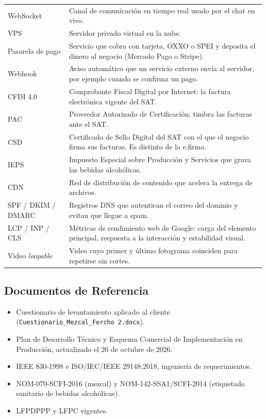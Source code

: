 \documentclass[11pt,letterpaper]{article}
\begin{document}
\begin{longtable}{@{} >{\raggedright\arraybackslash}p{3.4cm} >{\raggedright\arraybackslash}p{12.4cm} @{}}
WebSocket & Canal de comunicación en tiempo real usado por el chat en vivo. \\
VPS & Servidor privado virtual en la nube. \\
Pasarela de pago & Servicio que cobra con tarjeta, OXXO o SPEI y deposita el dinero al negocio (Mercado Pago o Stripe). \\
Webhook & Aviso automático que un servicio externo envía al servidor, por ejemplo cuando se confirma un pago. \\
CFDI 4.0 & Comprobante Fiscal Digital por Internet: la factura electrónica vigente del SAT. \\
PAC & Proveedor Autorizado de Certificación: timbra las facturas ante el SAT. \\
CSD & Certificado de Sello Digital del SAT con el que el negocio firma sus facturas. Es distinto de la e.firma. \\
IEPS & Impuesto Especial sobre Producción y Servicios que grava las bebidas alcohólicas. \\
CDN & Red de distribución de contenido que acelera la entrega de archivos. \\
SPF / DKIM / DMARC & Registros DNS que autentican el correo del dominio y evitan que llegue a spam. \\
LCP / INP / CLS & Métricas de rendimiento web de Google: carga del elemento principal, respuesta a la interacción y estabilidad visual. \\
Video \textit{loopable} & Video cuyo primer y último fotograma coinciden para repetirse sin cortes. \\
\bottomrule
\end{longtable}

\subsection{Documentos de Referencia}
\begin{itemize}[leftmargin=1.5em]
    \item Cuestionario de levantamiento aplicado al cliente (\texttt{Cuestionario\_Mezcal\_Fercho 2.docx}).
    \item Plan de Desarrollo Técnico y Esquema Comercial de Implementación en Producción, actualizado el 26 de octubre de 2026.
    \item IEEE 830-1998 e ISO/IEC/IEEE 29148:2018, ingeniería de requerimientos.
    \item NOM-070-SCFI-2016 (mezcal) y NOM-142-SSA1/SCFI-2014 (etiquetado sanitario de bebidas alcohólicas).
    \item LFPDPPP y LFPC vigentes.
\end{itemize}
\end{document}
